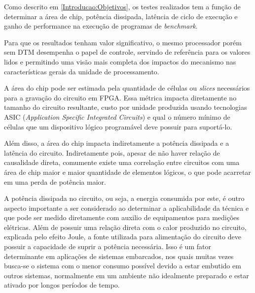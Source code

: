 Como descrito em \ref{Introducao:Objetivos}, os testes realizados tem a função de determinar a área de chip, potência dissipada, latência de ciclo de execução e ganho de performance na execução de programas de \textit{benchmark}.

Para que os resultados tenham valor significativo, o mesmo processador porém sem DTM desempenha o papel de controle, servindo de referência para os valores lidos e permitindo uma visão mais completa dos impactos do mecanismo nas características gerais da unidade de processamento.


A área do chip pode ser estimada pela quantidade de células ou \textit{slices} necessários para a gravação do circuito em FPGA. Essa métrica impacta diretamente no tamanho do circuito resultante, custo por unidade produzida usando tecnologias ASIC (\textit{Application Specific Integrated Circuits}) e qual o número mínimo de células que um dispositivo lógico programável deve possuir para suportá-lo. 

Além disso, a área do chip impacta indiretamente a potência dissipada e a latência do circuito. Indiretamente pois, apesar de não haver relação de causalidade direta, comumente existe uma correlação entre circuitos com uma área de chip maior e maior quantidade de elementos lógicos, o que pode acarretar em uma perda de potência maior.

A potência dissipada no circuito, ou seja, a energia consumida por este, é outro aspecto importante a ser considerado ao determinar a aplicabilidade da técnica e que pode ser medido diretamente com auxilio de equipamentos para medições elétricas. Além de possuir uma relação direta com o calor produzido no circuito, explicada pelo efeito Joule, a fonte utilizada para alimentação do circuito deve possuir a capacidade de suprir a potência necessária. Isso é um fator determinante em aplicações de sistemas embarcados, nos quais muitas vezes busca-se o sistema com o menor consumo possível devido a estar embutido em outros sistemas, normalmente em um ambiente não idealmente preparado e estar ativado por longos períodos de tempo.

